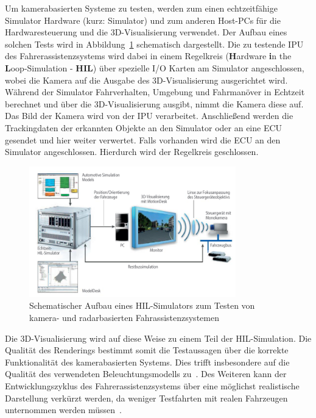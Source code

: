 Um kamerabasierten Systeme zu testen, werden zum einen echtzeitf\"ahige Simulator Hardware (kurz: Simulator) und zum anderen Host-PCs f\"ur die Hardwaresteuerung und die 3D-Visualisierung verwendet. Der Aufbau eines solchen Tests wird in Abbildung~\ref{fig:HiL} schematisch dargestellt. Die zu testende IPU des Fahrerassistenzsystems wird dabei in einem Regelkreis (\textbf{H}ardware \textbf{i}n the \textbf{L}oop-Simulation - \textbf{HIL}) \"uber spezielle I/O Karten am Simulator angeschlossen, wobei die Kamera auf die Ausgabe des 3D-Visualisierung ausgerichtet wird. W\"ahrend der Simulator Fahrverhalten, Umgebung und Fahrman\"over in Echtzeit berechnet und \"uber die 3D-Visualisierung ausgibt, nimmt die Kamera diese auf. Das Bild der Kamera wird von der IPU verarbeitet. Anschließend werden die Trackingdaten der erkannten Objekte an den Simulator oder an eine ECU gesendet und hier weiter verwertet. Falls vorhanden wird die ECU an den Simulator angeschlossen. Hierdurch wird der Regelkreis geschlossen.
\begin{figure}[t]
  \centering
    \includegraphics[width=0.8\textwidth]{images/Hil.png}
  \caption{Schematischer Aufbau eines HIL-Simulators zum Testen von kamera- und radarbasierten Fahrassistenzsystemen~\cite{dSPACEGmbH.2014}}
  \label{fig:HiL}
\end{figure}

Die 3D-Visualisierung wird auf diese Weise zu einem Teil der HIL-Simulation. Die Qualit\"at des Renderings bestimmt somit die Testaussagen \"uber die korrekte Funktionalit\"at des kamerabasierten Systems. Dies trifft insbesondere auf die Qualit\"at des verwendeten Beleuchtungsmodells zu~\cite{Nentwig.2014}.
Des Weiteren kann der Entwicklungszyklus des Fahrerassistenzsystems \"uber eine m\"oglichst realistische Darstellung verk\"urzt werden, da weniger Testfahrten mit realen Fahrzeugen unternommen werden m\"ussen~\cite{dSPACEGmbH.2013}.
